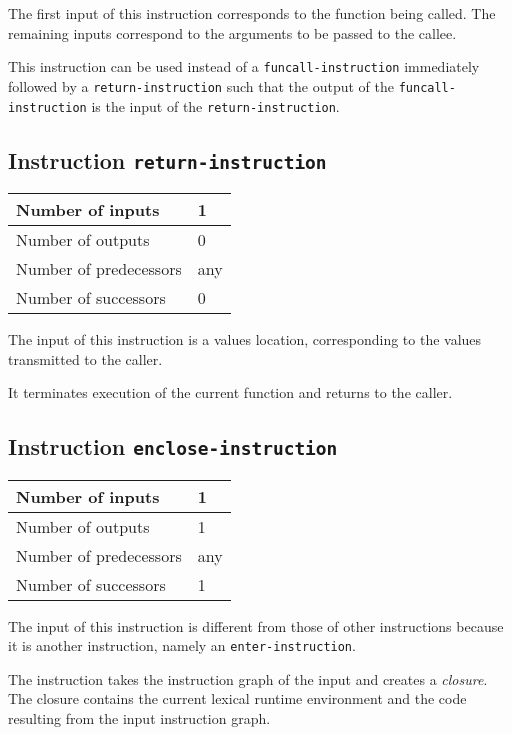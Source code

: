 The first input of this instruction corresponds to the function being
called.  The remaining inputs correspond to the arguments to be passed
to the callee.

This instruction can be used instead of a \texttt{funcall-instruction}
immediately followed by a \texttt{return-instruction} such that the
output of the \texttt{funcall-instruction} is the input of the
\texttt{return-instruction}.

\subsection{Instruction \texttt{return-instruction}}
\label{hir-instruction-return}

\begin{tabular}{|l|l|}
\hline
Number of inputs & 1\\
\hline
Number of outputs & 0\\
\hline
Number of predecessors & any\\
\hline
Number of successors & 0\\
\hline
\end{tabular}

The input of this instruction is a values location, corresponding to
the values transmitted to the caller.

It terminates execution of the current function and returns to the
caller. 

\subsection{Instruction \texttt{enclose-instruction}}
\label{hir-instruction-enclose}

\begin{tabular}{|l|l|}
\hline
Number of inputs & 1\\
\hline
Number of outputs & 1\\
\hline
Number of predecessors & any\\
\hline
Number of successors & 1\\
\hline
\end{tabular}

The input of this instruction is different from those of other
instructions because it is another instruction, namely an
\texttt{enter-instruction}.

The instruction takes the instruction graph of the input and creates a
\emph{closure}.  The closure contains the current lexical runtime
environment and the code resulting from the input instruction graph.

